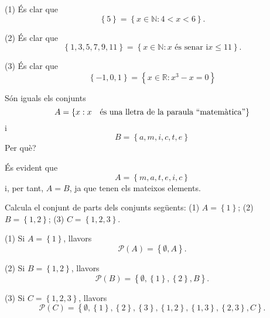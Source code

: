 \begin{solucio}
(1) \'{E}s clar que%
\begin{equation*}
\left\{ 5\right\} =\left\{ x\in \mathbb{N}:4<x<6\right\} \text{.}
\end{equation*}

(2) \'{E}s clar que%
\begin{equation*}
\left\{ 1,3,5,7,9,11\right\} =\left\{ x\in \mathbb{N}:x\text{ \'{e}s senar i
}x\leq 11\right\} \text{.}
\end{equation*}

(3) \'{E}s clar que%
\begin{equation*}
\left\{ -1,0,1\right\} =\left\{ x\in \mathbb{R}:x^{3}-x=0\right\}
\end{equation*}
\end{solucio}

\begin{exer}
S\'{o}n iguals els conjunts%
\begin{equation*}
A=\left\{ x:x\text{ \'{e}s una lletra de la paraula \textquotedblleft matem%
\`{a}tica\textquotedblright }\right\}
\end{equation*}%
i%
\begin{equation*}
B=\left\{ a,m,i,c,t,e\right\}
\end{equation*}%
Per qu\`{e}?
\end{exer}

\begin{solucio}
\'{E}s evident que%
\begin{equation*}
A=\left\{ m,a,t,e,i,c\right\}
\end{equation*}%
i, per tant, $A=B$, ja que tenen els mateixos elements.
\end{solucio}

\begin{exer}
Calcula el conjunt de parts dels conjunts seg\"{u}ents: (1) $A=\left\{
1\right\} $; (2) $B=\left\{ 1,2\right\} $; (3) $C=\left\{ 1,2,3\right\} $.
\end{exer}

\begin{solucio}
(1) Si $A=\left\{ 1\right\} $, llavors%
\begin{equation*}
\mathcal{P}(A)=\left\{ \emptyset ,A\right\} \text{.}
\end{equation*}

(2) Si $B=\left\{ 1,2\right\} $, llavors%
\begin{equation*}
\mathcal{P}(B)=\left\{ \emptyset ,\left\{ 1\right\} ,\left\{ 2\right\}
,B\right\} \text{.}
\end{equation*}

(3) Si $C=\left\{ 1,2,3\right\} $, llavors%
\begin{equation*}
\mathcal{P}(C)=\left\{ \emptyset ,\left\{ 1\right\} ,\left\{ 2\right\}
,\left\{ 3\right\} ,\left\{ 1,2\right\} ,\left\{ 1,3\right\} ,\left\{
2,3\right\} ,C\right\} \text{.}
\end{equation*}
\end{solucio}

